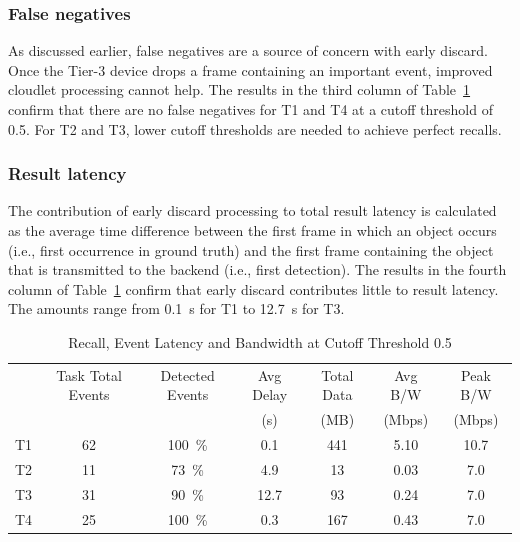 \subsubsection{False negatives}
As discussed earlier, false negatives are
a source of concern with early discard.  Once the Tier-3 device drops a frame
containing an important event, improved cloudlet processing cannot help. The
results in the third column of Table~\ref{fig:early-discard-results} confirm
that there are no false negatives for T1 and T4 at a cutoff threshold of 0.5.
For T2 and T3, lower cutoff thresholds are needed to achieve perfect recalls.

\subsubsection{Result latency}
The contribution of early discard processing to total result latency
is calculated as the average time difference between the first frame
in which an object occurs (i.e., first occurrence in ground truth) and
the first frame containing the object that is transmitted to the
backend (i.e., first detection).  The results in the fourth column of
Table~\ref{fig:early-discard-results} confirm that early discard
contributes little to result latency.  The amounts range from 0.1~s
for T1 to 12.7~s for T3.


\begin{table}
    \centering
    \begin{tabular}{|c|c|c|c|c|c|c|}
        \hline
           & Task Total Events & Detected Events  & Avg Delay      & Total Data     & Avg B/W & Peak B/W       \\
           &                   &                  & (s)            & (MB)           & (Mbps)  & (Mbps)         \\

        \hline
        T1 & \phantom{0}62     & 100~\%           & \phantom{0}0.1 & \phantom{0}441 & 5.10    & 10.7           \\
        \hline
        T2 & \phantom{0}11     & \phantom{0}73~\% & \phantom{0}4.9 & \phantom{00}13 & 0.03    & \phantom{0}7.0 \\ %
        \hline
        T3 & \phantom{0}31     & \phantom{0}90~\% & 12.7           & \phantom{00}93 & 0.24    & \phantom{0}7.0 \\ %
        \hline
        T4 & \phantom{0}25     & 100~\%           & \phantom{0}0.3 & \phantom{0}167 & 0.43    & \phantom{0}7.0 \\
        \hline
    \end{tabular}\\
    \caption{Recall, Event Latency and Bandwidth at Cutoff Threshold 0.5}
    \label{fig:early-discard-results}
\end{table}


